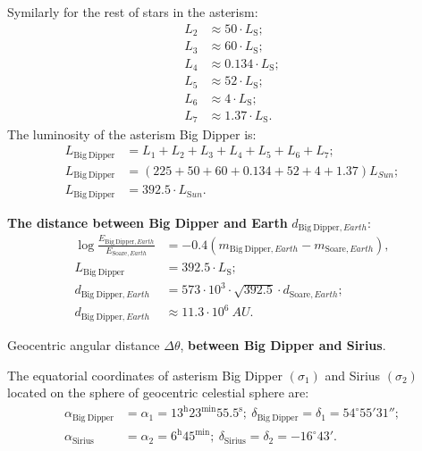\begin{description}
  Symilarly for the rest of stars in the asterism: %
  \begin{align*}
  L_2 &\approx 50\cdot L_{\mathrm{S}};\\
  L_3 &\approx 60\cdot L_{\mathrm{S}};\\
  L_4 &\approx 0.134\cdot L_{\mathrm{S}};
  \\
  L_5 &\approx 52\cdot L_{\mathrm{S}};\\
  L_6 &\approx 4\cdot L_{\mathrm{S}};\\
  L_7 &\approx 1.37\cdot L_{\mathrm{S}}.
  \end{align*}
  The luminosity of the asterism Big Dipper is:
  \begin{align*}
  L_{\mathrm{Big\ Dipper}} &= L_1 + L_2 + L_3 + L_4 + L_5 + L_6 + L_7;\\
  L_{\mathrm{Big\ Dipper}} &= (225 + 50 + 60 + 0.134 + 52 + 4
    + 1.37)L_{Sun};\\
  L_{\mathrm{Big\ Dipper}} &= 392.5\cdot L_{\mathrm{S}un}.
  \end{align*}
\item[d)] \textbf{The distance between Big Dipper and Earth}
  $d_{\mathrm{Big\ Dipper},Earth}$:
  \begin{align*}
  \log\frac{E_{\mathrm{Big\ Dipper},Earth}}{E_{\mathrm{Soare},Earth}}
    &= -0.4\left(m_{\mathrm{Big\ Dipper},Earth}
       - m_{\mathrm{Soare},Earth}\right),\\
  L_{\mathrm{Big\ Dipper}} &= 392.5\cdot L_{\mathrm{S}};\\
  d_{\mathrm{Big\ Dipper},Earth} &= 573\cdot10^{3}\cdot\sqrt{392.5}
    \cdot d_{\mathrm{Soare},Earth};\\
  d_{\mathrm{Big\ Dipper},Earth} &\approx 11.3\cdot10^{6}\ AU.
  \end{align*}
\item[e)] Geocentric angular distance $\Delta\theta$, \textbf{between
  Big Dipper and Sirius}. %

  The equatorial coordinates of asterism Big Dipper $(\sigma_1)$ and Sirius
  $(\sigma_2)$ located on the sphere of geocentric celestial sphere are:
  \begin{align*}
  \alpha_{\mathrm{Big\ Dipper}} &= \alpha_1
    = 13^{\mathrm{h}}23^{\mathrm{min}}55.5^{\mathrm{s}};\
  \delta_{\mathrm{Big\ Dipper}} = \delta_1 = 54^\circ55'31'';\\
  \alpha_{\mathrm{Sirius}} &= \alpha_2 = 6^{\mathrm{h}}45^{\mathrm{min}};\
  \delta_{\mathrm{Sirius}} = \delta_2 = -16^\circ43'.
  \end{align*}
  \ioaafig{2014_DA_D3-s1.pdf}


\end{description}
